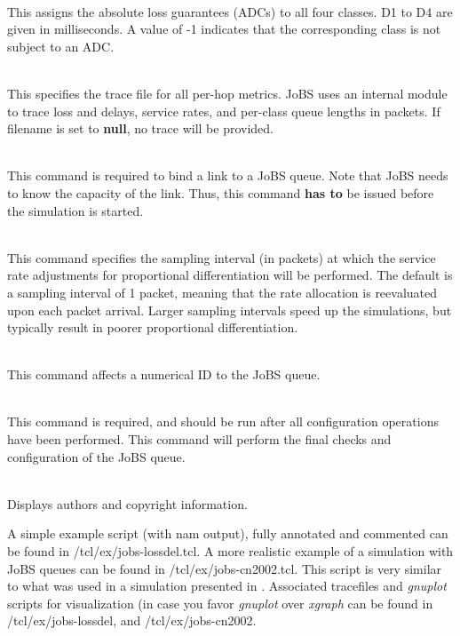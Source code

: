 \begin{flushleft}
\\
This assigns the absolute loss guarantees (ADCs) to all four classes. D1 to D4 
are given in milliseconds. A value of -1 indicates that 
the corresponding class is not subject to an ADC.

\\
This specifies the trace file for all per-hop metrics. JoBS uses an internal 
module to trace
loss and delays, service rates, and per-class queue lengths in packets. 
If filename is set to {\bf null}, no trace will be provided.

\\
This command is required to bind a link to a JoBS queue. Note that JoBS needs
to know the capacity of the link. Thus, 
this command {\bf has to} be issued before 
the simulation is started.

\\
This command specifies the sampling interval (in packets) at which the service 
rate adjustments for proportional differentiation will be performed. The 
default is a sampling interval of 1 packet, meaning that the rate allocation 
is reevaluated upon each packet arrival. Larger sampling intervals speed up 
the simulations, but typically result in poorer proportional differentiation.

\\
This command affects a numerical ID to the JoBS queue. 

\\
This command is required, and should be run after all configuration operations 
have been performed. 
This command will perform the final checks and configuration of the JoBS queue.

\\ 
Displays authors and copyright information.

A simple example script (with nam output), fully annotated and commented 
can be found in \ns/tcl/ex/jobs-lossdel.tcl. 
A more realistic example of a simulation with JoBS queues can be found in 
\ns/tcl/ex/jobs-cn2002.tcl. This script is very similar to what was used in 
a simulation presented in \cite{LiCh02}. 
Associated tracefiles and {\em gnuplot} scripts for visualization (in case you 
favor {\em gnuplot} over {\em xgraph}
can be found in \ns/tcl/ex/jobs-lossdel, and \ns/tcl/ex/jobs-cn2002.


\end{flushleft}

